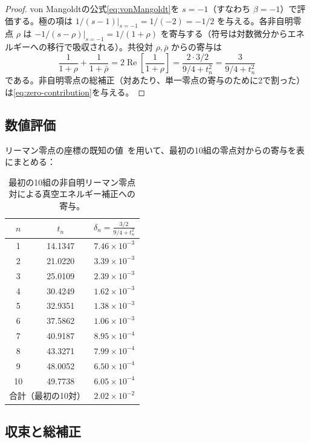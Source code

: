 \documentclass[12pt,a4paper]{article}
\begin{document}
\begin{proof}
von Mangoldtの公式\eqref{eq:vonMangoldt}を $s = -1$（すなわち $\beta = -1$）で評価する。極の項は $1/(s-1)|_{s=-1} = 1/(-2) = -1/2$ を与える。各非自明零点 $\rho$ は $-1/(s-\rho)|_{s=-1} = 1/(1+\rho)$ を寄与する（符号は対数微分からエネルギーへの移行で吸収される）。共役対 $\rho, \bar{\rho}$ からの寄与は
\[
  \frac{1}{1+\rho} + \frac{1}{1+\bar{\rho}} = 2\operatorname{Re}\!\left[\frac{1}{1+\rho}\right] = \frac{2 \cdot 3/2}{9/4 + t_n^2} = \frac{3}{9/4 + t_n^2}
\]
である。非自明零点の総補正（対あたり、単一零点の寄与のために2で割った）は\eqref{eq:zero-contribution}を与える。
\end{proof}

\subsection{数値評価}

リーマン零点の座標の既知の値~\cite{Odlyzko}を用いて、最初の10組の零点対からの寄与を表にまとめる：

\begin{table}[H]
\centering
\begin{tabular}{@{}ccc@{}}
\toprule
$n$ & $t_n$ & $\delta_n = \frac{3/2}{9/4 + t_n^2}$ \\
\midrule
1  & 14.1347 & $7.46 \times 10^{-3}$ \\
2  & 21.0220 & $3.39 \times 10^{-3}$ \\
3  & 25.0109 & $2.39 \times 10^{-3}$ \\
4  & 30.4249 & $1.62 \times 10^{-3}$ \\
5  & 32.9351 & $1.38 \times 10^{-3}$ \\
6  & 37.5862 & $1.06 \times 10^{-3}$ \\
7  & 40.9187 & $8.95 \times 10^{-4}$ \\
8  & 43.3271 & $7.99 \times 10^{-4}$ \\
9  & 48.0052 & $6.50 \times 10^{-4}$ \\
10 & 49.7738 & $6.05 \times 10^{-4}$ \\
\midrule
\multicolumn{2}{c}{合計（最初の10対）} & $2.02 \times 10^{-2}$ \\
\bottomrule
\end{tabular}
\caption{最初の10組の非自明リーマン零点対による真空エネルギー補正への寄与。}
\label{tab:zeros}
\end{table}

\subsection{収束と総補正}
\end{document}
